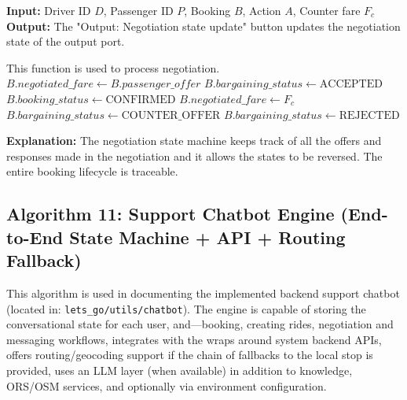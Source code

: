 \begin{breakablealgorithm}
\caption{Ride Fare Negotiation State Machine}
\textbf{Input:} Driver ID $D$, Passenger ID $P$, Booking $B$, Action $A$, Counter fare $F_c$ \\
\textbf{Output:} The "Output: Negotiation state update" button updates the negotiation state of the output port.
\begin{algorithmic}[1]
\State This function is used to process negotiation.
        \State $B.negotiated\_fare \gets B.passenger\_offer$
        \State $B.bargaining\_status \gets \text{ACCEPTED}$
        \State $B.booking\_status \gets \text{CONFIRMED}$
        \State $B.negotiated\_fare \gets F_c$
        \State $B.bargaining\_status \gets \text{COUNTER\_OFFER}$
        \State $B.bargaining\_status \gets \text{REJECTED}$
        \State {}
    \EndIf
    \State {}
    \State {}
    \State {}
\EndFunction
\end{algorithmic}
\end{breakablealgorithm}

\textbf{Explanation:} The negotiation state machine keeps track of all the offers and responses made in the negotiation and it allows the states to be reversed. The entire booking lifecycle is traceable.

\subsection{Algorithm 11: Support Chatbot Engine (End-to-End State Machine + API + Routing Fallback)}

This algorithm is used in documenting the implemented backend support chatbot (located in: \texttt{lets\_go/utils/chatbot}). The engine is capable of storing the conversational state for each user, and---booking, creating rides, negotiation and messaging workflows, integrates with the wraps around system backend APIs, offers routing/geocoding support if the chain of fallbacks to the local stop is provided, uses an LLM layer (when available) in addition to knowledge, ORS/OSM services, and optionally via environment configuration.

